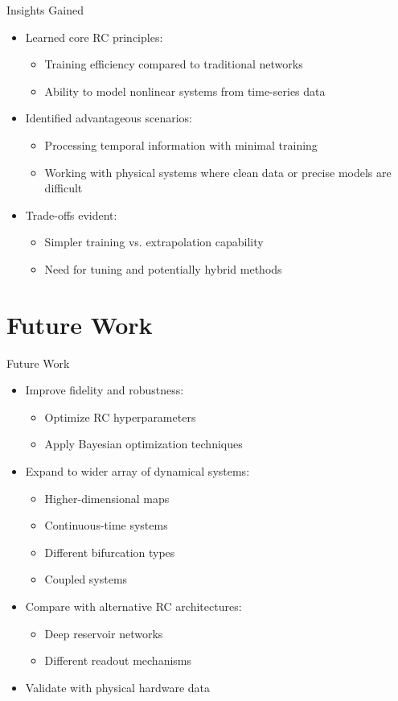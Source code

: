 \documentclass{beamer}
\begin{document}
\begin{frame}{Insights Gained}
\begin{itemize}
\item Learned core RC principles:
    \begin{itemize}
    \item Training efficiency compared to traditional networks
    \item Ability to model nonlinear systems from time-series data
    \end{itemize}
\item Identified advantageous scenarios:
    \begin{itemize}
    \item Processing temporal information with minimal training
    \item Working with physical systems where clean data or precise models are difficult
    \end{itemize}
\item Trade-offs evident:
    \begin{itemize}
    \item Simpler training vs. extrapolation capability
    \item Need for tuning and potentially hybrid methods
    \end{itemize}
\end{itemize}
\end{frame}

\section{Future Work}

\begin{frame}{Future Work}
\begin{itemize}
\item Improve fidelity and robustness:
    \begin{itemize}
    \item Optimize RC hyperparameters
    \item Apply Bayesian optimization techniques
    \end{itemize}
\item Expand to wider array of dynamical systems:
    \begin{itemize}
    \item Higher-dimensional maps
    \item Continuous-time systems
    \item Different bifurcation types
    \item Coupled systems
    \end{itemize}
\item Compare with alternative RC architectures:
    \begin{itemize}
    \item Deep reservoir networks
    \item Different readout mechanisms
    \end{itemize}
\item Validate with physical hardware data
\end{itemize}
\end{frame}
\end{document}
